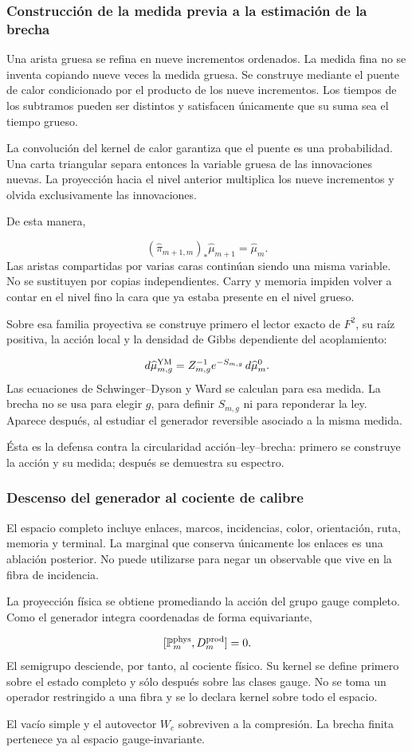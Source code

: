 \subsubsection{Construcción de la medida previa a la estimación de la brecha}
Una arista gruesa se refina en nueve incrementos ordenados. La medida fina no se inventa copiando nueve veces la medida gruesa. Se construye mediante el puente de calor condicionado por el producto de los nueve incrementos. Los tiempos de los subtramos pueden ser distintos y satisfacen únicamente que su suma sea el tiempo grueso.\par
La convolución del kernel de calor garantiza que el puente es una probabilidad. Una carta triangular separa entonces la variable gruesa de las innovaciones nuevas. La proyección hacia el nivel anterior multiplica los nueve incrementos y olvida exclusivamente las innovaciones.\par
De esta manera,\par
\[
(\widehat\pi_{m+1,m})_*
\widehat\mu_{m+1}
=
\widehat\mu_m.
\]
Las aristas compartidas por varias caras continúan siendo una misma variable. No se sustituyen por copias independientes. Carry y memoria impiden volver a contar en el nivel fino la cara que ya estaba presente en el nivel grueso.\par
Sobre esa familia proyectiva se construye primero el lector exacto de \(F^2\), su raíz positiva, la acción local y la densidad de Gibbs dependiente del acoplamiento:\par
\[
d\widehat\mu_{m,g}^{\rm YM}
=
Z_{m,g}^{-1}
e^{-S_{m,g}}\,
d\widehat\mu_m^0.
\]
Las ecuaciones de Schwinger–Dyson y Ward se calculan para esa medida. La brecha no se usa para elegir \(g\), para definir \(S_{m,g}\) ni para reponderar la ley. Aparece después, al estudiar el generador reversible asociado a la misma medida.\par
Ésta es la defensa contra la circularidad acción–ley–brecha: primero se construye la acción y su medida; después se demuestra su espectro.\par
{}
\subsubsection{Descenso del generador al cociente de calibre}
El espacio completo incluye enlaces, marcos, incidencias, color, orientación, ruta, memoria y terminal. La marginal que conserva únicamente los enlaces es una ablación posterior. No puede utilizarse para negar un observable que vive en la fibra de incidencia.\par
La proyección física se obtiene promediando la acción del grupo gauge completo. Como el generador integra coordenadas de forma equivariante,\par
\[
[\mathbb P_m^{\rm phys},D_m^{\rm prod}]=0.
\]
El semigrupo desciende, por tanto, al cociente físico. Su kernel se define primero sobre el estado completo y sólo después sobre las clases gauge. No se toma un operador restringido a una fibra y se lo declara kernel sobre todo el espacio.\par
El vacío simple y el autovector \(W_c\) sobreviven a la compresión. La brecha finita pertenece ya al espacio gauge-invariante.\par
{}
